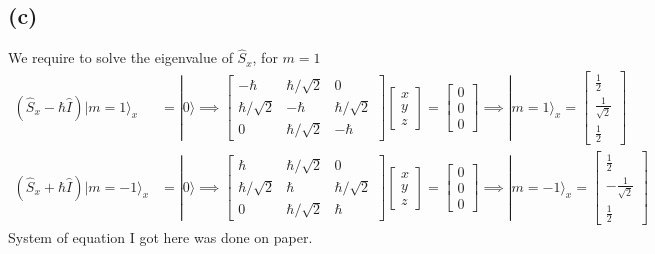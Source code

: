 \documentclass[letter]{article}
\newcommand{\hb}{\hbar}
\begin{document}
\subsection*{(c)} 
We require to solve the eigenvalue of $\hat{S}_x$, for $m = 1$ 
\begin{align*}
	(\hat{S}_x - \hb \hat{I} ) | m = 1 \rangle _x &= 
	| 0 \rangle 
\implies 
	\begin{bmatrix} -\hb & \hb / \sqrt{2} & 0 \\ 
	\hb / \sqrt{2} & - \hb & \hb / \sqrt{2}  \\ 
0 & \hb / \sqrt{2}  & - \hb \end{bmatrix} 
\begin{bmatrix} x \\ y \\ z \end{bmatrix}  = 
\begin{bmatrix} 0 \\ 0 \\ 0 \end{bmatrix}  \implies 
| m = 1 \rangle _x = 
\begin{bmatrix} \frac{1}{ 2 } \\ \frac{1}{\sqrt{2} } \\ \frac{1}{2}  \end{bmatrix} 
	\\
	(\hat{S}_x + \hb \hat{I} ) | m = -1 \rangle _x &= 
	| 0 \rangle 
\implies  
	\begin{bmatrix} \hb & \hb / \sqrt{2}  & 0 \\ 
	\hb / \sqrt{2}  & \hb & \hb / \sqrt{2}  \\ 
0 & \hb / \sqrt{2}  & \hb \end{bmatrix} 
\begin{bmatrix} x \\ y \\ z \end{bmatrix}  = 
\begin{bmatrix} 0 \\ 0 \\ 0 \end{bmatrix}  \implies 
| m = -1 \rangle _x = 
\begin{bmatrix} \frac{1}{ 2 } \\ - \frac{1}{\sqrt{2} } \\ \frac{1}{2}  \end{bmatrix} 
\end{align*}
System of equation I got here was done on paper.  
\end{document}
